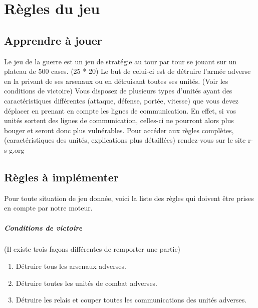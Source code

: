\chapter{Règles du jeu}

		\section{Apprendre à jouer}
		
		Le jeu de la guerre est un jeu de stratégie au tour par tour se jouant sur un plateau de 500 cases. (25 * 20)
		Le but de celui-ci est de détruire l'armée adverse en la privant de ses arsenaux ou en détruisant toutes ses unités. (Voir les conditions de victoire)
		Vous disposez de plusieurs types d'unités ayant des caractéristiques différentes (attaque, défense, portée, vitesse) que vous devez déplacer 
		en prenant en compte les lignes de communication.
		En effet, si vos unités sortent des lignes de communication, celles-ci ne pourront alors plus bouger et seront donc plus vulnérables.
		Pour accéder aux règles complètes, (caractéristiques des unités, explications plus détaillées) rendez-vous sur le site r-s-g.org~\cite{ref1}
		
		\section{Règles à implémenter}
		Pour toute situation de jeu donnée, voici la liste des règles qui doivent être prises en compte par notre moteur.

		\paragraph{Conditions de victoire}
                 (Il existe trois façons différentes de remporter une partie)
		\begin{enumerate}
		\item Détruire tous les arsenaux adverses.
		\item Détruire toutes les unités de combat adverses.
		\item Détruire les relais et couper toutes les communications des unités adverses.
		\end{enumerate}
		

